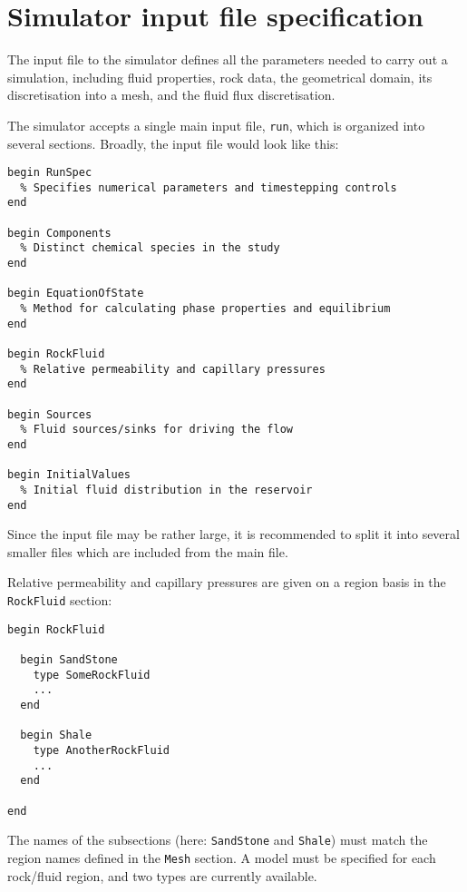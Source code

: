 \chapter{Simulator input file specification}
\label{chapter:input}

\minitoc

The input file to the simulator defines all the parameters needed to
carry out a simulation, including fluid properties, rock data, the
geometrical domain, its discretisation into a mesh, and the fluid flux
discretisation.



The simulator accepts a single main input file, \texttt{run}, which is
organized into several sections. Broadly, the input file would look
like this:
\begin{verbatim}
begin RunSpec
  % Specifies numerical parameters and timestepping controls
end

begin Components
  % Distinct chemical species in the study
end

begin EquationOfState
  % Method for calculating phase properties and equilibrium
end

begin RockFluid
  % Relative permeability and capillary pressures
end

begin Sources
  % Fluid sources/sinks for driving the flow
end

begin InitialValues
  % Initial fluid distribution in the reservoir
end
\end{verbatim}

Since the input file may be rather large, it is recommended to split
it into several smaller files which are included from the main file.



Relative permeability and capillary pressures are given on a region
basis in the \texttt{RockFluid} section:
\begin{verbatim}
begin RockFluid

  begin SandStone
    type SomeRockFluid
    ...
  end

  begin Shale
    type AnotherRockFluid
    ...
  end

end
\end{verbatim}
The names of the subsections (here: \texttt{SandStone} and
\texttt{Shale}) must match the region names defined in the
\texttt{Mesh} section. A model must be specified for each rock/fluid
region, and two types are currently available.

